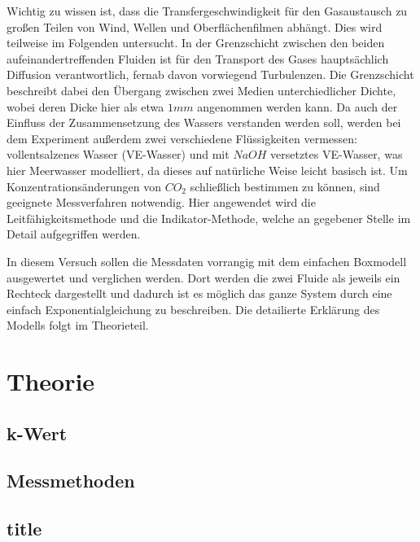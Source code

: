 \documentclass[12pt]{article}
\begin{document}
Wichtig zu wissen ist, dass die Transfergeschwindigkeit für den Gasaustausch zu großen Teilen von Wind, Wellen und Oberflächenfilmen abhängt. Dies wird teilweise im Folgenden untersucht. In der Grenzschicht zwischen den beiden aufeinandertreffenden Fluiden ist für den Transport des Gases hauptsächlich Diffusion verantwortlich, fernab davon vorwiegend Turbulenzen. Die Grenzschicht beschreibt dabei den Übergang zwischen zwei Medien unterchiedlicher Dichte, wobei deren Dicke hier als etwa $1 mm$ angenommen werden kann.
Da auch der Einfluss der Zusammensetzung des Wassers verstanden werden soll, werden bei dem Experiment außerdem zwei verschiedene Flüssigkeiten vermessen: vollentsalzenes Wasser (VE-Wasser) und mit $NaOH$ versetztes VE-Wasser, was hier Meerwasser modelliert, da dieses auf natürliche Weise leicht basisch ist. Um Konzentrationsänderungen von $CO_2$ schließlich bestimmen zu können, sind geeignete Messverfahren notwendig. Hier angewendet wird die Leitfähigkeitsmethode und die Indikator-Methode, welche an gegebener Stelle im Detail aufgegriffen werden. 

In diesem Versuch sollen die Messdaten vorrangig mit dem einfachen Boxmodell ausgewertet und verglichen werden. Dort werden die zwei Fluide als jeweils ein Rechteck dargestellt und dadurch ist es möglich das ganze System durch eine einfach Exponentialgleichung zu beschreiben. Die detailierte Erklärung des Modells folgt im Theorieteil.

\section{Theorie}

\subsection{k-Wert}
\subsection{Messmethoden}
\subsection{title}
\end{document}
